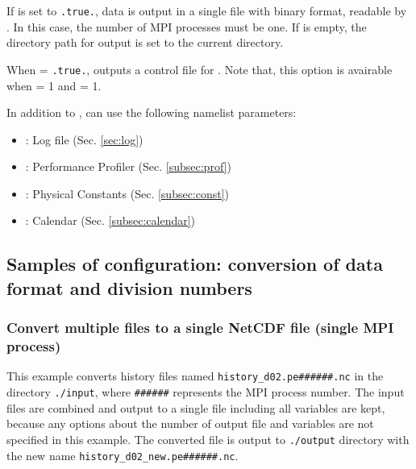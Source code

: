 If  is set to \verb|.true.|, data is output in a single file with binary format, readable by \grads.
In this case, the number of MPI processes must be one.
If  is empty, the directory path for output is set to the current directory.

When  = \verb|.true.|, \sno outputs a control file for \grads.
Note that, this option is avairable when  = 1 and  = 1.


In addition to , \sno can use the following namelist parameters:
%
\begin{itemize}
 \item {}: Log file (Sec. \ref{sec:log})
 \item {}: Performance Profiler (Sec. \ref{subsec:prof})
 \item {}: Physical Constants (Sec. \ref{subsec:const})
 \item {}: Calendar (Sec. \ref{subsec:calendar})
\end{itemize}



\subsection{Samples of configuration: conversion of data format and division numbers}

\subsubsection{Convert multiple \scalenetcdf files to a single NetCDF file (single MPI process)}
%
%
This example converts history files named \verb|history_d02.pe######.nc| in the directory \verb|./input|, where \verb|######| represents the MPI process number.
The input files are combined and output to a single file including all variables are kept,
because any options about the number of output file and variables are not specified in this example.
The converted file is output to \verb|./output| directory with the new name \verb|history_d02_new.pe######.nc|.

